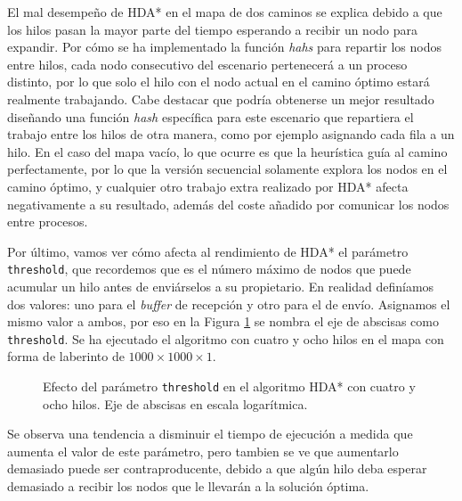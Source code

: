 \documentclass[a4paper,12pt]{article}
\begin{document}
El mal desempeño de HDA* en el mapa de dos caminos se explica debido a que los hilos pasan la mayor parte del tiempo esperando a recibir un nodo para expandir. Por cómo se ha implementado la función \textit{hahs} para repartir los nodos entre hilos, cada nodo consecutivo del escenario pertenecerá a un proceso distinto, por lo que solo el hilo con el nodo actual en el camino óptimo estará realmente trabajando. Cabe destacar que podría obtenerse un mejor resultado diseñando una función \textit{hash} específica para este escenario que repartiera el trabajo entre los hilos de otra manera, como por ejemplo asignando cada fila a un hilo. En el caso del mapa vacío, lo que ocurre es que la heurística guía al camino perfectamente, por lo que la versión secuencial solamente explora los nodos en el camino óptimo, y cualquier otro trabajo extra realizado por HDA* afecta negativamente a su resultado, además del coste añadido por comunicar los nodos entre procesos.

Por último, vamos ver cómo afecta al rendimiento de HDA* el parámetro \verb|threshold|, que recordemos que es el número máximo de nodos que puede acumular un hilo antes de enviárselos a su propietario. En realidad definíamos dos valores: uno para el \textit{buffer} de recepción y otro para el de envío. Asignamos el mismo valor a ambos, por eso en la Figura \ref{fig:threshold} se nombra el eje de abscisas como \verb|threshold|. Se ha ejecutado el algoritmo con cuatro y ocho hilos en el mapa con forma de laberinto de $1000 \times 1000 \times 1$.

\begin{figure}[H]
    \centering
    \begin{subfigure}[b]{0.49\textwidth}
        
    \end{subfigure}
    \hfill
    \begin{subfigure}[b]{0.49\textwidth}
        
    \end{subfigure}

    \caption{Efecto del parámetro \texttt{threshold} en el algoritmo HDA* con cuatro y ocho hilos. Eje de abscisas en escala logarítmica.}
    \label{fig:threshold}
\end{figure}

Se observa una tendencia a disminuir el tiempo de ejecución a medida que aumenta el valor de este parámetro, pero tambien se ve que aumentarlo demasiado puede ser contraproducente, debido a que algún hilo deba esperar demasiado a recibir los nodos que le llevarán a la solución óptima.
\end{document}
